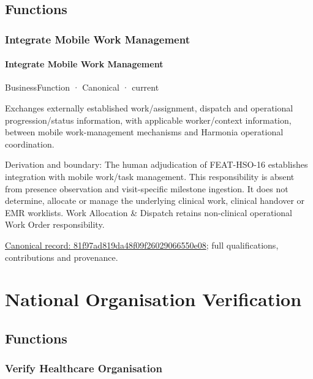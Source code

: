 \subsection{Functions}

\subsubsection{Integrate Mobile Work Management}

\paragraph{Integrate Mobile Work Management}

\label{element:81f97ad819da48f09f26029066550e08}
{\small BusinessFunction · Canonical · current}\par

Exchanges externally established work/assignment, dispatch and operational progression/status information, with applicable worker/context information, between mobile work-management mechanisms and Harmonia operational coordination.



Derivation and boundary: The human adjudication of FEAT-HSO-16 establishes integration with mobile work/task management. This responsibility is absent from presence observation and visit-specific milestone ingestion. It does not determine, allocate or manage the underlying clinical work, clinical handover or EMR worklists. Work Allocation \& Dispatch retains non-clinical operational Work Order responsibility.


{\footnotesize \href{../../../../continuum/business/business-function/81f97ad819da48f09f26029066550e08.md}{Canonical record: 81f97ad819da48f09f26029066550e08}; full qualifications, contributions and provenance.}\par
\section{National Organisation Verification}

\subsection{Functions}

\subsubsection{Verify Healthcare Organisation}

